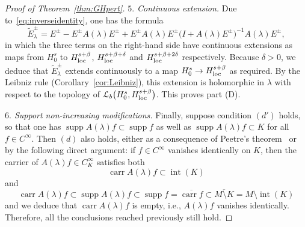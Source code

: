 \documentclass[pdftex]{sigma}
\numberwithin{equation}{section}
\newcommand{\LL}{{\mathcal L}}
\DeclareMathOperator{\carr}{carr}
\DeclareMathOperator{\supp}{supp}
\DeclareMathOperator{\inte}{int}
\newcommand{\loc}{{\rm loc}}
\begin{document}
\begin{proof}[Proof of Theorem~\ref{thm:GHpert}]
 	\emph{$5.$ Continuous extension.} Due to~\eqref{eq:inverseidentity}, one has the formula
 	\begin{equation*}
 		\tilde{E}_\lambda^\pm = E^\pm - E^\pm A(\lambda)E^\pm + E^\pm A(\lambda)E^\pm \big(I+ A(\lambda)E^\pm\big)^{-1}A(\lambda)E^\pm,
 	\end{equation*}
 	in which the three terms on the right-hand side have continuous
 	extensions as maps from $H^s_0$ to $H^{s+\beta}_\loc$, $H^{s+\beta+\delta}_\loc$ and $H^{s+\beta+2\delta}_\loc$ respectively. Because $\delta>0$, we deduce that $\tilde{E}^\pm_\lambda$
 	extends continuously to a map $H^s_0\to H_\loc^{s+\beta}$ as required.
 	By the Leibniz rule (Corollary~\ref{cor:Leibniz}), this extension is holomorphic in $\lambda$ with respect to the topology of $\LL_b\big(H^s_0,H_\loc^{s+\beta}\big)$.
 	This proves part (D).
 	
 	
 	\emph{$6.$ Support non-increasing modifications.} Finally, suppose condition $(d')$ holds, so that one has $\supp A(\lambda)f\subset \supp f$ as well as
 	$\supp A(\lambda)f\subset K$ for all $f\in C^\infty$. Then $(d)$ also holds,
 	either as a consequence of Peetre's theorem~\cite{Peetre:1960} or by the
 	following direct argument:
 	if $f\in C^\infty$ vanishes identically on $K$, then the carrier of $A(\lambda)f\in C^\infty_K$ satisfies
 	both
 	\begin{equation*}
 		\carr A(\lambda)f \subset \inte(K)
 	\end{equation*}
 	and
 	\begin{equation*}
 		\carr A(\lambda)f\subset \supp A(\lambda)f\subset \supp f=\overline{\carr f}\subset \overline{M\setminus K} = M\setminus \inte(K)
 	\end{equation*}
 	and we deduce that $\carr A(\lambda)f$ is empty, i.e., $A(\lambda)f$ vanishes identically. Therefore, all the conclusions reached previously still hold.
 	

\end{proof}
\end{document}
